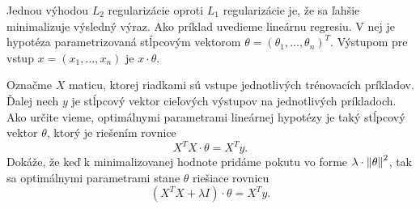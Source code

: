 \begin{exercise}
  Jednou výhodou $L_2$ regularizácie oproti $L_1$ regularizácie je, že
  sa ľahšie minimalizuje výsledný výraz. Ako príklad uvedieme lineárnu
  regresiu. V nej je hypotéza parametrizovaná stĺpcovým vektorom
  $\theta = (\theta_1, \ldots, \theta_n)^T$. Výstupom pre vstup
  $x = (x_1, \ldots, x_n)$ je $x \cdot \theta$. 
  
  Označme $X$ maticu, ktorej riadkami sú vstupe jednotlivých trénovacích
  príkladov. Ďalej nech $y$ je stĺpcový vektor cieľových výstupov na
  jednotlivých príkladoch. Ako určite vieme, optimálnymi parametrami
  lineárnej hypotézy je taký stĺpcový vektor $\theta$, ktorý je riešením
  rovnice
  $$X^T X \cdot \theta = X^T y.$$
  Dokáže, že keď k minimalizovanej hodnote pridáme pokutu vo forme
  $\lambda \cdot \left\lVert\theta\right\rVert^2$, tak sa optimálnymi parametrami stane
  $\theta$ riešiace rovnicu
  $$(X^T X + \lambda I) \cdot \theta = X^T y.$$
\end{exercise}
